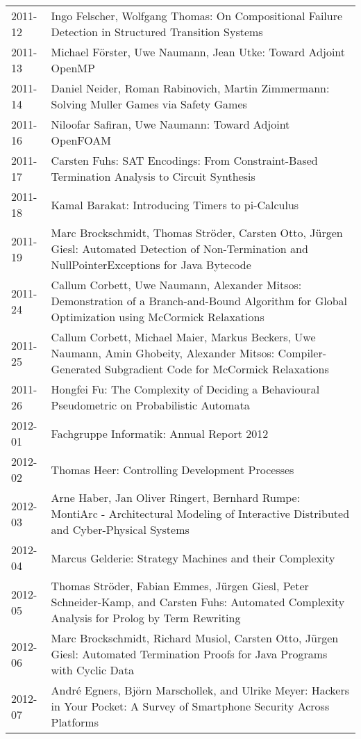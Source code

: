 \documentclass[color]{aib}
\begin{document}
\begin{longtable}{lp{11cm}}
2011-12 & Ingo Felscher, Wolfgang Thomas:         On Compositional Failure Detection in Structured Transition Systems\\
2011-13 & Michael F\"{o}rster, Uwe Naumann, Jean Utke:         Toward Adjoint OpenMP\\
2011-14 & Daniel Neider, Roman Rabinovich, Martin Zimmermann:         Solving Muller Games via Safety Games\\
2011-16 & Niloofar Safiran, Uwe Naumann:         Toward Adjoint OpenFOAM\\
2011-17 & Carsten Fuhs:         SAT Encodings: From Constraint-Based Termination Analysis to Circuit Synthesis
\\
2011-18 & Kamal Barakat:         Introducing Timers to pi-Calculus\\
2011-19 & Marc Brockschmidt, Thomas Str\"{o}der, Carsten Otto, J\"{u}rgen Giesl:         Automated Detection of Non-Termination and NullPointerExceptions for Java Bytecode\\
2011-24 & Callum Corbett, Uwe Naumann, Alexander Mitsos:         Demonstration of a Branch-and-Bound Algorithm for Global Optimization using McCormick Relaxations\\
2011-25 & Callum Corbett, Michael Maier, Markus Beckers, Uwe Naumann, Amin Ghobeity, Alexander Mitsos:         Compiler-Generated Subgradient Code for McCormick Relaxations\\
2011-26 & Hongfei Fu:         The Complexity of Deciding a Behavioural Pseudometric on Probabilistic Automata\\
2012-01 & Fachgruppe Informatik:         Annual Report 2012\\
2012-02 & Thomas Heer:         Controlling Development Processes\\
2012-03 & Arne Haber, Jan Oliver Ringert, Bernhard Rumpe:         MontiArc - Architectural Modeling of Interactive Distributed and Cyber-Physical Systems\\
2012-04 & Marcus Gelderie:         Strategy Machines and their Complexity\\
2012-05 & Thomas Str\"{o}der, Fabian Emmes, J\"{u}rgen Giesl, Peter Schneider-Kamp, and Carsten Fuhs:         Automated Complexity Analysis for Prolog by Term Rewriting\\
2012-06 & Marc Brockschmidt, Richard Musiol, Carsten Otto, J\"{u}rgen Giesl:         Automated Termination Proofs for Java Programs with Cyclic Data\\
2012-07 & Andr\'{e} Egners, Bj\"{o}rn Marschollek, and Ulrike Meyer:         Hackers in Your Pocket: A Survey of Smartphone Security Across Platforms\\

\end{longtable}
\end{document}
